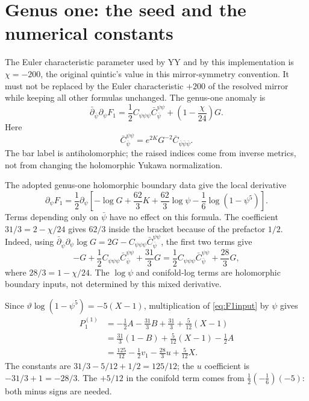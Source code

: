 \documentclass[11pt,a4paper]{article}
\numberwithin{equation}{section}
\newcommand{\bdel}{\bar\partial_{\bar\psi}}
\newcommand{\tht}{\vartheta}
\newcommand{\del}{\partial}
\newcommand{\Pg}[2]{P_{#1}^{(#2)}}
\begin{document}
\section{Genus one: the seed and the numerical constants}

The Euler characteristic parameter used by YY and by this implementation is
$\chi=-200$, the original quintic's value in this mirror-symmetry convention.
It must not be replaced by the Euler characteristic $+200$ of the resolved
mirror while keeping all other formulas unchanged. The genus-one anomaly is
\begin{equation}
\bdel\del_\psi F_1
 =\frac12 C_{\psi\psi\psi}\bar C_{\bar\psi}^{\psi\psi}
   +\left(1-\frac\chi{24}\right)G.
\end{equation}
Here
\begin{equation}
\bar C_{\bar\psi}^{\psi\psi}
 =e^{2K}G^{-2}\bar C_{\bar\psi\bar\psi\bar\psi}.
\end{equation}
The bar label is antiholomorphic; the raised indices come from inverse
metrics, not from changing the holomorphic Yukawa normalization.

The adopted genus-one holomorphic boundary data give the local derivative
\begin{equation}
\del_\psi F_1=\frac12\del_\psi
 \left[-\log G+\frac{62}{3}K
       +\frac{62}{3}\log\psi-\frac16\log(1-\psi^5)\right].
\label{eq:F1input}
\end{equation}
Terms depending only on $\bar\psi$ have no effect on this formula.
The coefficient $31/3=2-\chi/24$ gives $62/3$ inside the bracket because
of the prefactor $1/2$. Indeed, using
$\bdel\del_\psi\log G=2G-C_{\psi\psi\psi}\bar C_{\bar\psi}^{\psi\psi}$,
the first two terms give
\begin{equation}
-G+\frac12 C_{\psi\psi\psi}\bar C_{\bar\psi}^{\psi\psi}+\frac{31}{3}G
 =\frac12 C_{\psi\psi\psi}\bar C_{\bar\psi}^{\psi\psi}+\frac{28}{3}G,
\end{equation}
where $28/3=1-\chi/24$. The $\log\psi$ and conifold-log terms
are holomorphic boundary inputs, not determined by this mixed derivative.

Since $\tht\log(1-\psi^5)=-5(X-1)$, multiplication of
\eqref{eq:F1input} by $\psi$ gives
\begin{align}
\Pg 11
 &=-\frac12A-\frac{31}{3}B+\frac{31}{3}
      +\frac5{12}(X-1)\\
 &=\frac{31}{3}(1-B)+\frac5{12}(X-1)-\frac12A\\
 &=\boxed{\frac{125}{12}-\frac12v_1-\frac{28}{3}u+\frac5{12}X}.
\label{eq:seed}
\end{align}
The constants are $31/3-5/12+1/2=125/12$; the $u$ coefficient is
$-31/3+1=-28/3$. The $+5/12$ in the conifold term comes from
$\tfrac12(-\tfrac16)(-5)$: both minus signs are needed.
\end{document}
